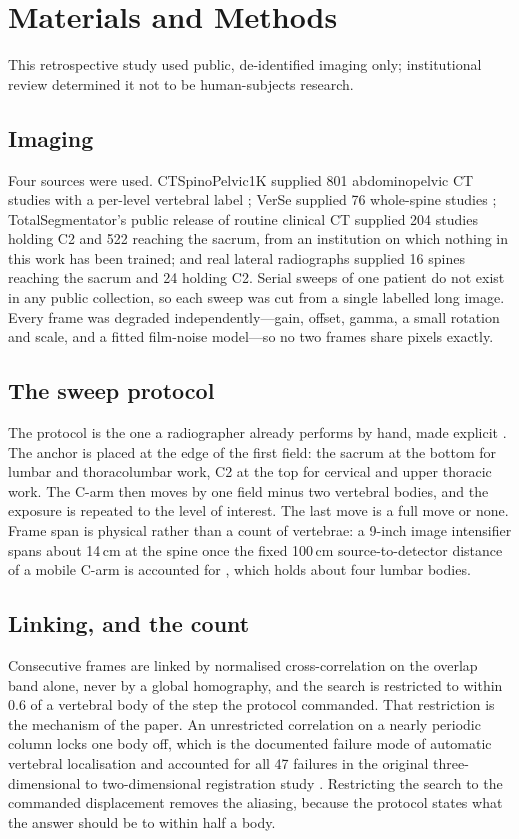 \documentclass[11pt,letterpaper]{article}
\begin{document}
\section*{Materials and Methods}

This retrospective study used public, de-identified imaging only; institutional review determined it not to
be human-subjects research.

\subsection*{Imaging}
Four sources were used. CTSpinoPelvic1K supplied 801 abdominopelvic CT studies with a per-level vertebral
label \citep{ctsp1k}; VerSe supplied 76 whole-spine studies \citep{verse2021}; TotalSegmentator's public
release of routine clinical CT supplied 204 studies holding C2 and 522 reaching the sacrum, from an
institution on which nothing in this work has been trained; and real lateral radiographs supplied 16 spines
reaching the sacrum and 24 holding C2. Serial sweeps of one patient do not exist in any public collection,
so each sweep was cut from a single labelled long image. Every frame was degraded independently---gain,
offset, gamma, a small rotation and scale, and a fitted film-noise model---so no two frames share pixels
exactly.

\subsection*{The sweep protocol}
The protocol is the one a radiographer already performs by hand, made explicit \citep{schwing2026ctx}. The
anchor is placed at the edge of the first field: the sacrum at the bottom for lumbar and thoracolumbar work,
C2 at the top for cervical and upper thoracic work. The C-arm then moves by one field minus two vertebral
bodies, and the exposure is repeated to the level of interest. The last move is a full move or none. Frame
span is physical rather than a count of vertebrae: a 9-inch image intensifier spans about 14\,cm at the
spine once the fixed 100\,cm source-to-detector distance of a mobile C-arm is accounted for
\citep{naik2022,ge_k170752}, which holds about four lumbar bodies.

\subsection*{Linking, and the count}
Consecutive frames are linked by normalised cross-correlation on the overlap band alone, never by a global
homography, and the search is restricted to within 0.6 of a vertebral body of the step the protocol
commanded. That restriction is the mechanism of the paper. An unrestricted correlation on a nearly periodic
column locks one body off, which is the documented failure mode of automatic vertebral localisation and
accounted for all 47 failures in the original three-dimensional to two-dimensional registration study
\citep{otake2012fail}. Restricting the search to the commanded displacement removes the aliasing, because
the protocol states what the answer should be to within half a body.
\end{document}
